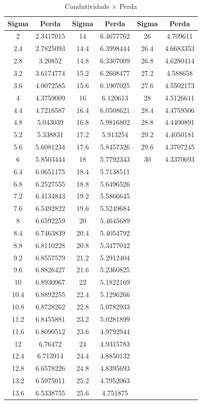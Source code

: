 \documentclass[
	12pt,				%
	openright,			%
	twoside,			%
	a4paper,			%
	english,			%
	french,				%
	spanish,			%
	brazil,				%
	]{abntex2}
\begin{document}
\begin{apendicesenv}
\newpage
\begin{table}[H]
\caption{Condutividade  $\times$  Perda \label{tab:p_c}}
\centering
\begin{tabular}{c c| c c | c c}
Sigma & Perda & Sigma & Perda & Sigma & Perda \\
\hline 
2 & 2.3417015 & 14 & 6.4677762 & 26 & 4.709611\\
2.4 & 2.7825093 & 14.4 & 6.3998444 & 26.4 & 4.6683353\\
2.8 & 3.20852 & 14.8 & 6.3307009 & 26.8 & 4.6280414\\
3.2 & 3.6174774 & 15.2 & 6.2608477 & 27.2 & 4.588658\\
3.6 & 4.0072585 & 15.6 & 6.1907025 & 27.6 & 4.5502173\\
4 & 4.3759009 & 16 & 6.120613 & 28 & 4.5126611\\
4.4 & 4.7216587 & 16.4 & 6.0508621 & 28.4 & 4.4759506\\
4.8 & 5.043039 & 16.8 & 5.9816802 & 28.8 & 4.4400891\\
5.2 & 5.338831 & 17.2 & 5.913254 & 29.2 & 4.4050181\\
5.6 & 5.6081234 & 17.6 & 5.8457326 & 29.6 & 4.3707245\\
6 & 5.8503444 & 18 & 5.7792343 & 30 & 4.3370693\\
6.4 & 6.0651175 & 18.4 & 5.7138511\\
6.8 & 6.2527555 & 18.8 & 5.6496526\\
7.2 & 6.4134843 & 19.2 & 5.5866645\\
7.6 & 6.5492822 & 19.6 & 5.5249684\\
8 & 6.6592259 & 20 & 5.4645689\\
8.4 & 6.7463839 & 20.4 & 5.4054792\\
8.8 & 6.8110228 & 20.8 & 5.3477042\\
9.2 & 6.8557579 & 21.2 & 5.2912404\\
9.6 & 6.8826427 & 21.6 & 5.2360825\\
10 & 6.8930967 & 22 & 5.1822169\\
10.4 & 6.8892255 & 22.4 & 5.1296266\\
10.8 & 6.8728262 & 22.8 & 5.0782933\\
11.2 & 6.8455881 & 23.2 & 5.0281899\\
11.6 & 6.8090512 & 23.6 & 4.9792944\\
12 & 6.76472 & 24 & 4.9315783\\
12.4 & 6.713914 & 24.4 & 4.8850132\\
12.8 & 6.6578226 & 24.8 & 4.8395693\\
13.2 & 6.5975011 & 25.2 & 4.7952063\\
13.6 & 6.5338755 & 25.6 & 4.751875


\end{tabular}
\end{table}
\end{apendicesenv}
\end{document}
